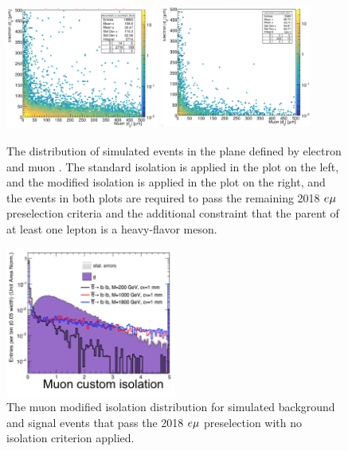 \begin{figure}
\centering
\includegraphics[width=0.45\textwidth]{figures/selection/StandardIso_ElectronD0vsMuonD0_2018emuTTbar.png}
\includegraphics[width=0.44\textwidth]{figures/selection/CustomIso_ElectronD0vsMuonD0_2018emuTTbar.png}
\caption{The distribution of \ttbar simulated events in the plane defined by electron \ad and muon \ad. The standard isolation is applied in the plot on the left, and the modified isolation is applied in the plot on the right, and the events in both plots are required to pass the remaining 2018 $e{\mu}$ preselection criteria and the additional constraint that the parent of at least one lepton is a heavy-flavor meson. }
\label{iso_performance_comparison}
\end{figure}

\begin{figure}
\centering
\includegraphics[width=0.5\textwidth]{figures/selection/MuonCustomIso_TTbar_Signal.png}
\caption{The muon modified isolation distribution for simulated \ttbar background and \stoptolb signal events that pass the 2018 $e{\mu}$ preselection with no isolation criterion applied.}
\label{iso_signal_bg}
\end{figure}
